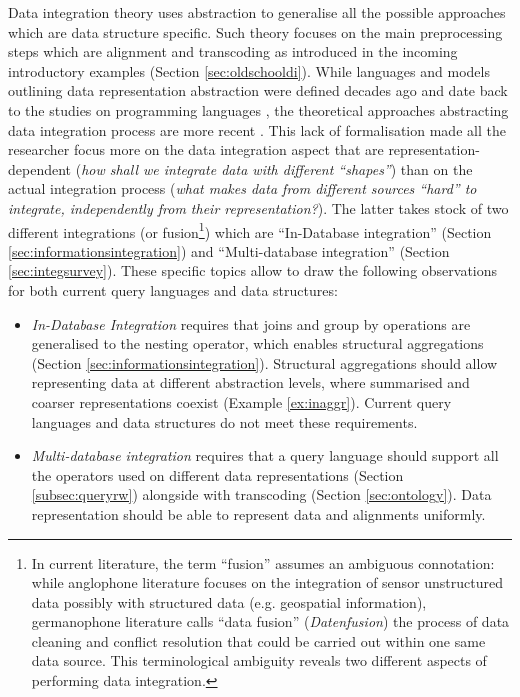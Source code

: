 Data integration theory uses abstraction to generalise all the possible approaches which are data structure specific. Such theory focuses on the main preprocessing steps which are alignment and transcoding as introduced in the incoming introductory examples (Section \ref{sec:oldschooldi}). While languages and models outlining data representation abstraction were defined decades ago and date back to the studies on programming languages \cite{omg96,TPLPierce}, the theoretical approaches abstracting data integration process are more recent \cite{Lenzerini02,DeGiacomo2018}. This lack of formalisation made all the researcher focus more on the data integration aspect that are representation-dependent (\textit{how shall we integrate data with different ``shapes''}) than on the actual integration process (\textit{what makes data from different sources ``hard'' to integrate, independently from their representation?}). The latter takes stock of two different integrations (or fusion\footnote{In current literature, the term ``fusion'' assumes an ambiguous connotation: while anglophone literature \cite{Hall97,KHALEGHI201328} focuses on the integration of sensor unstructured data possibly with structured data (e.g. geospatial information), germanophone literature \cite{deII,Bleiholder09} calls ``data fusion'' (\textit{Datenfusion}) the process of data cleaning and conflict resolution that could be carried out within one same data source. This terminological ambiguity reveals two different aspects of performing data integration.}) which are ``In-Database integration'' (Section \ref{sec:informationsintegration}) and ``Multi-database integration'' (Section \ref{sec:integsurvey}). These specific topics allow to draw the following observations for both current query languages and data structures:
\begin{itemize}
\item  \textit{In-Database Integration} requires that joins and group by operations are generalised to the nesting operator, which enables structural aggregations (Section \ref{sec:informationsintegration}). Structural aggregations should allow representing data at different abstraction levels, where summarised and coarser representations coexist (Example \vref{ex:inaggr}). Current query languages and data structures do not meet these requirements.
\item \textit{Multi-database integration} requires that a query language should support all the operators used on different data representations (Section \ref{subsec:queryrw}) alongside with transcoding (Section \ref{sec:ontology}). Data representation should be able to represent data and alignments uniformly.
\end{itemize}


